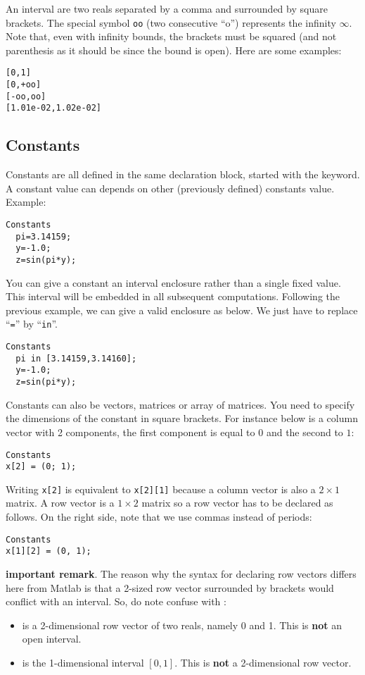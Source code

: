 An interval are two reals separated by a comma
and surrounded by square brackets. The special symbol
{\tt oo} (two consecutive ``o'') represents the infinity $\infty$.
Note that, even with infinity bounds, the brackets
must be squared (and not parenthesis as it should be since the
bound is open). Here are some examples:

\begin{verbatim}
[0,1]
[0,+oo]
[-oo,oo]
[1.01e-02,1.02e-02]
\end{verbatim}

\subsection{Constants}
Constants are all defined in the same declaration block, 
started with the  keyword.
A constant value can depends on other (previously defined) constants value. Example:

\begin{verbatim}
Constants
  pi=3.14159;
  y=-1.0;
  z=sin(pi*y);
\end{verbatim} 

You can give a constant an interval enclosure rather than a single fixed value.
This interval will be embedded in all subsequent computations.
Following the previous example, we can give  a valid enclosure as below.
We just have to replace ``{\tt =}'' by ``{\tt in}''.


\begin{verbatim}
Constants
  pi in [3.14159,3.14160];
  y=-1.0;
  z=sin(pi*y);
\end{verbatim}

Constants can also be vectors, matrices or array of matrices.
You need to specify the dimensions of the constant in square brackets.
For instance  below is a column vector with 2 components, the first component is equal
to $0$ and the second to $1$:
\begin{verbatim}
Constants
x[2] = (0; 1);
\end{verbatim}
Writing {\tt x[2]} is equivalent to {\tt x[2][1]} because a column vector is also
a $2\times 1$ matrix.
A row vector is a $1\times 2$ matrix so a row vector has to be declared as follows. 
On the right side, note that we use commas instead of periods:
\begin{verbatim}
Constants
x[1][2] = (0, 1);
\end{verbatim}

{\bf important remark}. 
The reason why the syntax for declaring row vectors differs here from Matlab is that a 2-sized row vector surrounded
by brackets would conflict with an interval. So, do note confuse
\cf{[0,1]} with :
\begin{itemize}
\item {} is a 2-dimensional row vector of two reals, namely 0 and 1.
This is {\bf not} an open interval.
\item \cf{[0,1]} is the 1-dimensional interval $[0,1]$. This is {\bf not} a 2-dimensional row vector.
\end{itemize}

